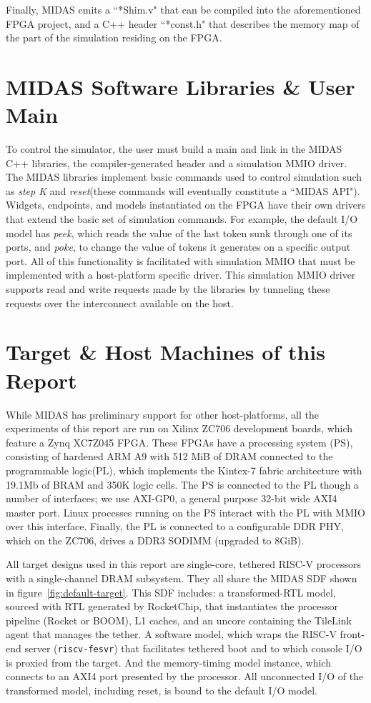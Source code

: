 Finally, MIDAS emits a ``*Shim.v" that can be compiled into the aforementioned
FPGA project, and a C++ header ``*const.h" that describes the memory map of the
part of the simulation residing on the FPGA.

\section{MIDAS Software Libraries \& User Main}

To control the simulator, the user must build a main and link in the MIDAS C++
libraries, the compiler-generated header and a simulation MMIO driver.  The
MIDAS libraries implement basic commands used to control simulation such as
\emph{step K} and \emph{reset}(these commands will eventually constitute a
``MIDAS API"). Widgets, endpoints, and models instantiated on the FPGA have
their own drivers that extend the basic set of simulation commands. For
example, the default I/O model has \emph{peek}, which reads the value of the
last token sunk through one of its ports, and \emph{poke}, to change the value
of tokens it generates on a specific output port.  All of this functionality is
facilitated with simulation MMIO that must be implemented with a host-platform
specific driver. This simulation MMIO driver supports read and write requests
made by the libraries by tunneling these requests over the interconnect available
on the host.

\section{Target \& Host Machines of this Report}\label{sec:targetandhostmachines}

While MIDAS has preliminary support for other host-platforms, all the
experiments of this report are run on Xilinx ZC706 development boards, which
feature a Zynq XC7Z045 FPGA. These FPGAs have a processing system (PS),
consisting of hardened ARM A9 with 512 MiB of DRAM connected to the
programmable logic(PL), which implements the Kintex-7 fabric architecture with
19.1Mb of BRAM and 350K logic cells. The PS is connected to the PL though a
number of interfaces; we use AXI-GP0, a general purpose 32-bit wide AXI4 master port.
Linux processes running on the PS interact with the PL with MMIO over this
interface. Finally, the PL is connected to a configurable DDR PHY, which on the
ZC706, drives a DDR3 SODIMM (upgraded to 8GiB).

All target designs used in this report are single-core, tethered RISC-V
processors with a single-channel DRAM subsystem.  They all share the MIDAS SDF
shown in figure~\ref{fig:default-target}. This SDF includes: a transformed-RTL
model, sourced with RTL generated by RocketChip, that instantiates the
processor pipeline (Rocket or BOOM), L1 caches, and an uncore containing the
TileLink agent that manages the tether. A software model, which wraps the
RISC-V front-end server (\texttt{riscv-fesvr}) that facilitates tethered boot
and to which console I/O is proxied from the target. And the memory-timing
model instance, which connects to an AXI4 port presented by the processor.
All unconnected I/O of the transformed model, including reset, is bound to the
default I/O model.

